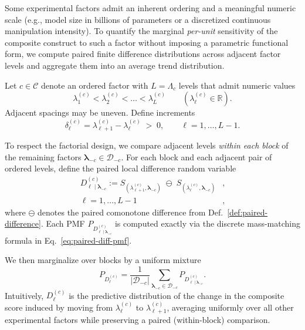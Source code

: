 Some experimental factors admit an inherent ordering and a meaningful numeric
scale 
(e.g., model size in billions of parameters or a discretized
continuous manipulation intensity). 
To quantify the marginal \emph{per-unit}
sensitivity of the composite construct to such a factor without imposing a
parametric functional form, we compute paired finite
difference distributions across adjacent factor levels and aggregate them into an average
trend distribution.

Let $c\in\mathcal{C}$ denote an ordered factor with $L=\Lambda_c$ levels that
admit numeric values
\[
\lambda^{(c)}_1 < \lambda^{(c)}_2 < \dots < \lambda^{(c)}_L
\qquad (\lambda^{(c)}_\ell \in \mathbb{R}).
\]
Adjacent spacings may be uneven. Define increments
\[
\delta^{(c)}_\ell
=
\lambda^{(c)}_{\ell+1}-\lambda^{(c)}_\ell
\;>\;0,
\qquad
\ell=1,\dots,L-1.
\]

To respect the factorial design, we compare adjacent levels \emph{within each
block} of the remaining factors $\boldsymbol{\lambda}_{-c}\in\mathcal{D}_{-c}$.
For each block and each adjacent pair of ordered levels, define the paired
local difference random variable
\begin{align}
\label{eq:local-diff-block}
D^{(c)}_{\ell\mid \boldsymbol{\lambda}_{-c}}:=S_{(\lambda^{(c)}_{\ell+1},\boldsymbol{\lambda}_{-c})}
\;\ominus\;
S_{(\lambda^{(c)}_{\ell},\boldsymbol{\lambda}_{-c})}&, \\
\ell=1,\dots,L-1&,
\end{align}
where $\ominus$ denotes the paired comonotone difference from
Def.~\ref{def:paired-difference}. Each PMF
$P_{D^{(c)}_{\ell\mid \boldsymbol{\lambda}_{-c}}}$ is computed exactly via the
discrete mass-matching formula in Eq.~\eqref{eq:paired-diff-pmf}.

We then marginalize over blocks by a uniform mixture
\begin{equation}
\label{eq:local-diff}
P_{D^{(c)}_\ell}
=
\frac{1}{|\mathcal{D}_{-c}|}
\sum_{\boldsymbol{\lambda}_{-c}\in\mathcal{D}_{-c}}
P_{D^{(c)}_{\ell\mid \boldsymbol{\lambda}_{-c}}}.
\end{equation}
Intuitively, $D^{(c)}_\ell$ is the predictive distribution of the change in the
composite score induced by moving from $\lambda^{(c)}_\ell$ to
$\lambda^{(c)}_{\ell+1}$, averaging uniformly over all other experimental
factors while preserving a paired (within-block) comparison.

